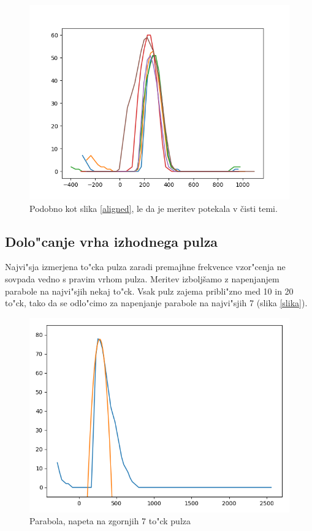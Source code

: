 \documentclass[12pt,a4paper]{article}
\begin{document}
\begin{figure}[H]
	\begin{center}
		\includegraphics[width=12cm]{dark.png}
		\caption{Podobno kot slika \ref{aligned}, le da je meritev potekala v čisti temi.}
		\label{dark}
	\end{center}
\end{figure}

\subsection{Dolo"canje vrha izhodnega pulza}
Najvi"sja izmerjena to"cka pulza zaradi premajhne frekvence vzor"cenja ne sovpada vedno s pravim vrhom pulza. 
Meritev izboljšamo z napenjanjem parabole na najvi"sjih nekaj to"ck. Vsak pulz zajema pribli"zno med 10 in 20 to"ck, tako da se odlo"cimo za napenjanje parabole na najvi"sjih 7 (slika \ref{slika}).

\begin{figure}[H]
	\begin{center}
		\includegraphics[width=12cm]{parabola-fitted.png}
		\caption{Parabola, napeta na zgornjih 7 to"ck pulza}
		\label{dark}
	\end{center}
\end{figure}
\end{document}
